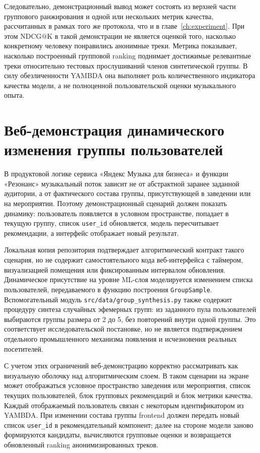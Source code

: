 Следовательно, демонстрационный вывод может состоять из верхней части группового ранжирования и одной или нескольких метрик качества, рассчитанных в рамках того же протокола, что и в главе~\ref{ch:experiment}. При этом $\mathrm{NDCG@K}$ в такой демонстрации не является оценкой того, насколько конкретному человеку понравились анонимные треки. Метрика показывает, насколько построенный групповой ranking поднимает достижимые релевантные треки относительно тестовых прослушиваний членов синтетической группы. В силу обезличенности YAMBDA она выполняет роль количественного индикатора качества модели, а не полноценной пользовательской оценки музыкального опыта.

\section{Веб-демонстрация динамического изменения группы пользователей}
\label{sec:ch6:web-demo}

В продуктовой логике сервиса «Яндекс Музыка для бизнеса» и функции «Резонанс» музыкальный поток зависит не от абстрактной заранее заданной аудитории, а от фактического состава группы, присутствующей в заведении или на мероприятии. Поэтому демонстрационный сценарий должен показать динамику: пользователь появляется в условном пространстве, попадает в текущую группу, список \texttt{user\_id} обновляется, модель пересчитывает рекомендации, а интерфейс отображает новый результат.

Локальная копия репозитория подтверждает алгоритмический контракт такого сценария, но не содержит самостоятельного кода веб-интерфейса с таймером, визуализацией помещения или фиксированным интервалом обновления. Динамическое присутствие на уровне ML-слоя моделируется изменением списка пользователей, передаваемого в функцию построения \texttt{GroupSample}. Вспомогательный модуль \texttt{src/data/group\_synthesis.py} также содержит процедуру синтеза случайных эфемерных групп: из заданного пула пользователей выбираются группы размера от 2 до 5, без повторений внутри одной группы. Это соответствует исследовательской постановке, но не является подтверждением отдельного промышленного механизма появления и исчезновения реальных посетителей.

С учетом этих ограничений веб-демонстрацию корректно рассматривать как визуальную оболочку над алгоритмическим слоем. В таком сценарии на экране может отображаться условное пространство заведения или мероприятия, список текущих пользователей, блок групповых рекомендаций и блок метрики качества. Каждый отображаемый пользователь связан с некоторым идентификатором из YAMBDA. При изменении состава группы frontend должен передать новый список \texttt{user\_id} в рекомендательный компонент; далее на стороне модели заново формируются кандидаты, вычисляются групповые оценки и возвращается обновленный ranking анонимизированных треков.

